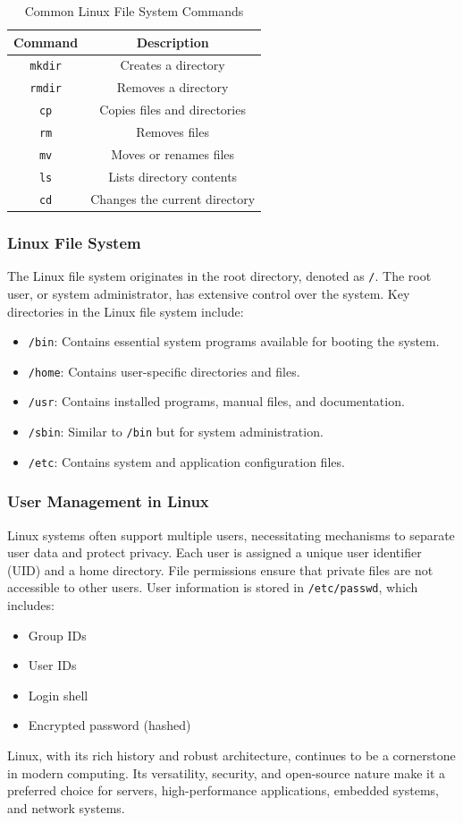 \begin{table}[h!]
\centering
\begin{tabular}{|c|c|}
\hline
\textbf{Command} & \textbf{Description} \\
\hline
\texttt{mkdir} & Creates a directory \\
\texttt{rmdir} & Removes a directory \\
\texttt{cp} & Copies files and directories \\
\texttt{rm} & Removes files \\
\texttt{mv} & Moves or renames files \\
\texttt{ls} & Lists directory contents \\
\texttt{cd} & Changes the current directory \\
\hline
\end{tabular}
\caption{Common Linux File System Commands}
\label{table:filesystem_commands}
\end{table}

\subsubsection{Linux File System}
The Linux file system originates in the root directory, denoted as \texttt{/}. The root user, or system administrator, has extensive control over the system. Key directories in the Linux file system include:
\begin{itemize}
    \item \texttt{/bin}: Contains essential system programs available for booting the system.
    \item \texttt{/home}: Contains user-specific directories and files.
    \item \texttt{/usr}: Contains installed programs, manual files, and documentation.
    \item \texttt{/sbin}: Similar to \texttt{/bin} but for system administration.
    \item \texttt{/etc}: Contains system and application configuration files.
\end{itemize}

\subsubsection{User Management in Linux}
Linux systems often support multiple users, necessitating mechanisms to separate user data and protect privacy. Each user is assigned a unique user identifier (UID) and a home directory. File permissions ensure that private files are not accessible to other users. User information is stored in \texttt{/etc/passwd}, which includes:
\begin{itemize}
    \item Group IDs
    \item User IDs
    \item Login shell
    \item Encrypted password (hashed)
\end{itemize}

Linux, with its rich history and robust architecture, continues to be a cornerstone in modern computing. Its versatility, security, and open-source nature make it a preferred choice for servers, high-performance applications, embedded systems, and network systems.
